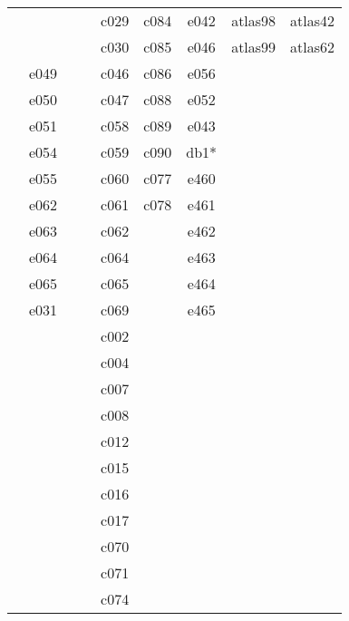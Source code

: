 \documentclass[10pt,letterpaper]{article}
\begin{document}
\begin{center}
\begin{tabular}{ |c|c|c|c|c|c|c|c|c| }
        &      &         &         & c029 & c084       & e042 & atlas98 & atlas42 \\
        &      &         &         & c030 & c085       & e046 & atlas99 & atlas62 \\
        & e049 &         &         & c046 & c086       & e056 &         &         \\
        & e050 &         &         & c047 & c088       & e052 &         &         \\
        & e051 &         &         & c058 & c089       & e043 &         &         \\
        & e054 &         &         & c059 & c090       & db1* &         &         \\
        & e055 &         &         & c060 & c077       & e460 &         &         \\
        & e062 &         &         & c061 & c078       & e461 &         &         \\
        & e063 &         &         & c062 &            & e462 &         &         \\
        & e064 &         &         & c064 &            & e463 &         &         \\
        & e065 &         &         & c065 &            & e464 &         &         \\
        & e031 &         &         & c069 &            & e465 &         &         \\
        &      &         &         & c002 &            &      &         &         \\
        &      &         &         & c004 &            &      &         &         \\
        &      &         &         & c007 &            &      &         &         \\
        &      &         &         & c008 &            &      &         &         \\
        &      &         &         & c012 &            &      &         &         \\
        &      &         &         & c015 &            &      &         &         \\
        &      &         &         & c016 &            &      &         &         \\
        &	   &	     &         & c017 &            &	  &		    &		  \\
        &	   &	     &         & c070 &            &	  &		    &		  \\
        &	   &	     &         & c071 &            &	  &		    &		  \\
        &	   &	     &         & c074 &            &	  &		    &		  \\


        \hline
        \end{tabular}
        \end{center}
\end{document}
